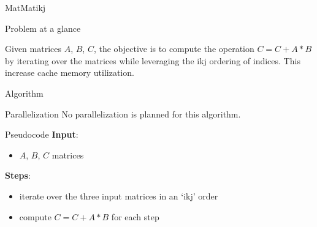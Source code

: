 \begin{chapter}{MatMatikj}
    \begin{section}{Problem at a glance}
        \par Given matrices $A$, $B$, $C$, the objective is to compute the  operation $C = C + A * B$ by iterating over the matrices while leveraging the ikj ordering of indices. This increase cache memory utilization.
    \end{section}
    \begin{section}{Algorithm}
        \begin{subsection}{Parallelization}
            No parallelization is planned for this algorithm.
        \end{subsection}
        \begin{subsection}{Pseudocode}
            \textbf{Input}:
            \begin{itemize}
                \item $A$, $B$, $C$ matrices
            \end{itemize}
            \textbf{Steps}:
            \begin{itemize}
                \item iterate over the three input matrices in an `ikj' order
                \item compute $C = C + A * B$ for each step
            \end{itemize}
            
        \end{subsection}
    \end{section}
\end{chapter}